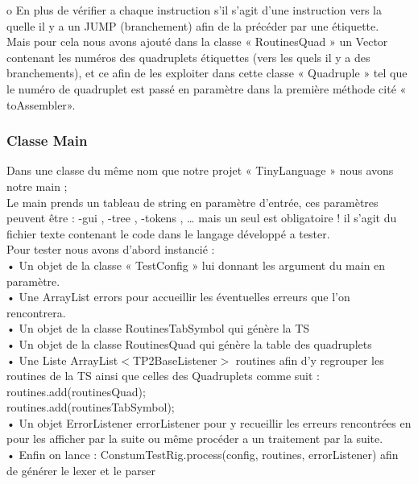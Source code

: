 \documentclass[12pt]{article}
\begin{document}
o	En plus de vérifier a chaque instruction s'il s'agit d'une instruction vers la quelle il y a un JUMP (branchement) afin de la précéder par une étiquette.\\
Mais pour cela nous avons ajouté dans la classe « RoutinesQuad » un Vector contenant les numéros des quadruplets étiquettes (vers les quels il y a des branchements), et ce afin de les exploiter dans cette classe « Quadruple » tel que le numéro de quadruplet est passé en paramètre dans la première méthode cité « toAssembler».\\

\subsubsection{Classe Main}

Dans une classe du même nom que notre projet « TinyLanguage » nous avons notre main ;\\
Le main prends un tableau de string en paramètre d'entrée, ces paramètres peuvent être : -gui , -tree , -tokens , … mais un seul est obligatoire ! il s'agit du fichier texte contenant le code dans le langage développé a tester.\\

Pour tester nous avons d’abord instancié :\\
•	Un objet de la classe « TestConfig » lui donnant les argument du main en paramètre.\\
•	Une ArrayList errors pour accueillir les éventuelles erreurs que l'on rencontrera.\\
•	Un objet de la classe RoutinesTabSymbol qui génère la TS \\
•	Un objet de la classe RoutinesQuad qui génère la table des quadruplets\\
•	Une Liste ArrayList$<$TP2BaseListener$>$ routines afin d'y regrouper les routines de la TS ainsi que celles des Quadruplets comme suit : \\
        routines.add(routinesQuad);\\
        routines.add(routinesTabSymbol);\\

•	Un objet ErrorListener errorListener pour y recueillir les erreurs rencontrées en pour les afficher par la suite ou même procéder a un traitement par la suite.\\

•	Enfin on lance : ConstumTestRig.process(config, routines, errorListener) afin de générer le lexer et le parser \\
\end{document}
